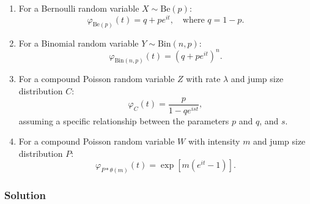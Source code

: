\documentclass{article}
\begin{document}
\begin{enumerate}[label=(\alph*)]
    \item
    For a Bernoulli random variable \(X \sim \text{Be}(p)\):
    \[
    \varphi_{\text{Be}(p)}(t) = q + p e^{it}, \quad \text{where } q = 1-p.
    \]
    
    \item 
    
    For a Binomial random variable \(Y \sim \text{Bin}(n,p)\):
    \[
    \varphi_{\text{Bin}(n,p)}(t) = (q + p e^{it})^n.
    \]
    
    \item 
    
    For a compound Poisson random variable \(Z\) with rate \(\lambda\) and jump size distribution \(C\):
    \[
    \varphi_{C}(t) = \frac{p}{1 - q e^{ist}},
    \]
    assuming a specific relationship between the parameters \(p\) and \(q\), and \(s\).
    
    \item 
    
    For a compound Poisson random variable \(W\) with intensity \(m\) and jump size distribution \(P\):
    \[
    \varphi_{P \ast \theta(m)}(t) = \exp\left[m(e^{it} - 1)\right].
    \]
\end{enumerate}
\subsubsection*{Solution}
\end{document}
